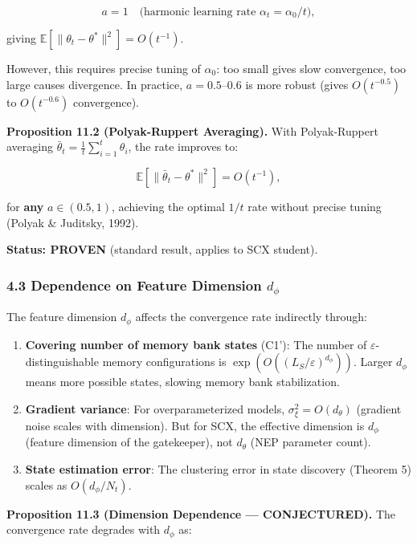 \documentclass[
  12pt,
]{ctexart}
\begin{document}
\[a = 1 \quad \text{(harmonic learning rate } \alpha_t = \alpha_0 / t \text{)},\]

giving \(\mathbb{E}[\|\theta_t - \theta^*\|^2] = O(t^{-1})\).

However, this requires precise tuning of \(\alpha_0\): too small gives
slow convergence, too large causes divergence. In practice,
\(a = 0.5\)--\(0.6\) is more robust (gives \(O(t^{-0.5})\) to
\(O(t^{-0.6})\) convergence).

\textbf{Proposition 11.2 (Polyak-Ruppert Averaging).} With
Polyak-Ruppert averaging
\(\bar{\theta}_t = \frac{1}{t}\sum_{i=1}^t \theta_i\), the rate improves
to:

\[\mathbb{E}[\|\bar{\theta}_t - \theta^*\|^2] = O(t^{-1}),\]

for \textbf{any} \(a \in (0.5, 1)\), achieving the optimal \(1/t\) rate
without precise tuning (Polyak \& Juditsky, 1992).

\textbf{Status: PROVEN} (standard result, applies to SCX student).

\subsubsection{\texorpdfstring{4.3 Dependence on Feature Dimension
\(d_\phi\)}{4.3 Dependence on Feature Dimension d\_\textbackslash phi}}\label{dependence-on-feature-dimension-d_phi}

The feature dimension \(d_\phi\) affects the convergence rate indirectly
through:

\begin{enumerate}
\def\labelenumi{\arabic{enumi}.}
\item
  \textbf{Covering number of memory bank states} (C1'): The number of
  \(\varepsilon\)-distinguishable memory configurations is
  \(\exp(O((L_S/\varepsilon)^{d_\phi}))\). Larger \(d_\phi\) means more
  possible states, slowing memory bank stabilization.
\item
  \textbf{Gradient variance}: For overparameterized models,
  \(\sigma_\xi^2 = O(d_\theta)\) (gradient noise scales with dimension).
  But for SCX, the effective dimension is \(d_\phi\) (feature dimension
  of the gatekeeper), not \(d_\theta\) (NEP parameter count).
\item
  \textbf{State estimation error}: The clustering error in state
  discovery (Theorem 5) scales as \(O(d_\phi / N_t)\).
\end{enumerate}

\textbf{Proposition 11.3 (Dimension Dependence --- CONJECTURED).} The
convergence rate degrades with \(d_\phi\) as:
\end{document}

